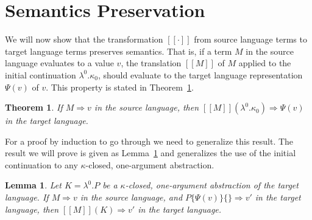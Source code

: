 \documentclass[a4paper,11pt,draft]{article}
\newtheorem{lemma}{\sffamily Lemma}
\newtheorem{theorem}{\sffamily Theorem}
\begin{document}
\section{Semantics Preservation}\label{sec:semanticpreservation}

We will now show that the transformation $[\![\cdot]\!]$ from source language
terms to target language terms preserves semantics. That is, if a term $M$ in
the source language evaluates to a value $v$, the translation $[\![M]\!]$ of $M$
applied to the initial continuation $\lambda^{0}.\kappa_{0}$, should evaluate to
the target language representation $\Psi(v)$ of $v$. This property is stated in
Theorem~\ref{thm:maintheorem}.

\begin{theorem}\label{thm:maintheorem}
If $M \Rightarrow v$ in the source language, then
$[\![M]\!] (\lambda^{0}.\kappa_{0}) \Rightarrow \Psi(v)$ in the target language.
\end{theorem}

For a proof by induction to go through we need to generalize this result. The
result we will prove is given as Lemma~\ref{lem:mainlemma} and generalizes the
use of the initial continuation to any $\kappa$-closed, one-argument
abstraction.

\begin{lemma}\label{lem:mainlemma}
  Let $K = \lambda^{0}.P$ be a $\kappa$-closed, one-argument
  abstraction of the target language. If $M \Rightarrow v$ in the
  source language, and $P\{\Psi(v)\}\{\} \Rightarrow v'$ in the target
  language, then $[\![M]\!](K) \Rightarrow v'$ in the target language.
\end{lemma}
\end{document}
